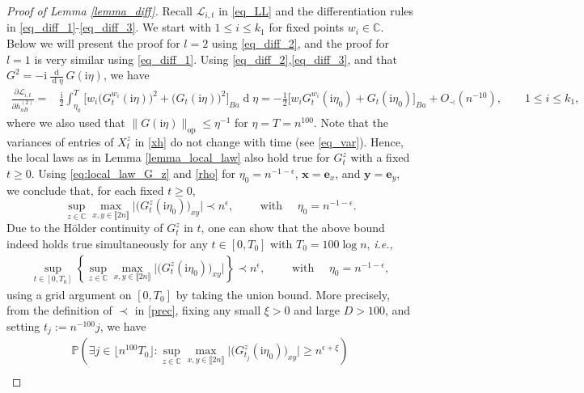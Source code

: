 \documentclass[10pt,reqno]{amsart}
\numberwithin{equation}{section}
\numberwithin{figure}{section}
\theoremstyle{plain}
\newcommand{\C}{{\mathbb{C}}}
\newcommand{\ii}{\mathrm{i}}
\newcommand{\<}{\langle}
\renewcommand{\>}{\rangle}
\renewcommand{\P}{{\mathbb P}}
\newcommand{\dd}{\operatorname{d}\!{}}
\newcommand{\ie}{\emph{i.e., }}
\newcommand{\II}{\mathcal{L}_{i,t}}
\begin{document}
\begin{proof}[Proof of Lemma \ref{lemma_diff}]
	
	Recall $\II$ in \eqref{eq_LL} and the differentiation rules in \eqref{eq_diff_1}-\eqref{eq_diff_3}. We start with $1\leq i\leq k_1$ for fixed points $w_i \in \C$. Below we will present the proof for $l=2$ using \eqref{eq_diff_2}, and the proof for $l=1$ is very similar using \eqref{eq_diff_1}. 
	Using \eqref{eq_diff_2},\eqref{eq_diff_3}, and that $G^2=-\ii \frac{\dd}{\dd \eta} G(\ii \eta)$, we have
	\begin{align}\label{diff_L}
		\frac{\partial \II }{\partial h^{(2)}_{aB}}
		=&\frac{\ii}{2}  \int_{\eta_0}^{T}  \big[ w_i\big(G_t^{w_i}(\ii \eta)\big)^2  +\big(G_t(\ii \eta)\big)^2 \big]_{Ba}  \dd \eta =   -\frac{1}{2}\big[w_i G^{w_i}_t(\ii \eta_0)+G_t(\ii \eta_0)\big]_{Ba} +O_\prec(n^{-10}), \qquad 1\leq i\leq k_1,
	\end{align}
	where we also used that $\|G(\ii \eta)\|_{\mathrm{op}} \leq \eta^{-1}$ for $\eta=T=n^{100}$. Note that the variances of entries of $X^z_t$ in \eqref{xh} do not change with time (see \eqref{eq_var}). Hence, the local laws as in Lemma \ref{lemma_local_law} also hold true for $G^z_t$ with a fixed $t\geq 0$. 
%
%
%
%
%
%
%
%
%
%
%
Using \eqref{eq:local_law_G_z} and \eqref{rho} for $\eta_0=n^{-1-\epsilon}$, $\mathbf{x}=\mathbf{e}_{x}$, and $\mathbf{y}=\mathbf{e}_{y}$, we conclude that, for each fixed $t\geq 0$,
	$$
	\sup_{z\in \C} \max_{x,y \in \llbracket 2n \rrbracket}   \Big|\big( G^{z}_t(\ii \eta_0) \big)_{xy}\Big| \prec n^{\epsilon}, \qquad \mbox{~with~} \quad \eta_0=n^{-1-\epsilon}.
	$$
	Due to the H\"{o}lder continuity of $G^{z}_t$ in $t$, one can show that the above bound indeed holds true simultaneously for any $t\in [0,T_0]$ with $T_0=100\log n$, \ie
	\begin{align}\label{eq_G_bound}
		\sup_{t\in [0,T_0]}  \left\{    \sup_{z\in \C} \max_{x,y \in \llbracket 2n \rrbracket}  \Big|\big( G^{z}_t(\ii \eta_0) \big)_{xy}\Big| \right\} \prec n^{\epsilon}, \qquad \mbox{~with~} \quad \eta_0=n^{-1-\epsilon},
	\end{align}
	using a grid argument on $[0,T_0]$ by taking the union bound.  More precisely, from the definition of $\prec$ in \eqref{prec}, fixing any small $\xi>0$ and large $D>100$, and setting $t_j:=n^{-100}j$, we have 
    \begin{multline}\label{union}
    \P\left( \exists j \in \lfloor n^{100}T_0 \rfloor : \sup_{z\in \C} \max_{x,y \in \llbracket 2n \rrbracket}   \Big|\big( G^{z}_{t_j}(\ii \eta_0) \big)_{xy}\Big| \geq n^{\epsilon+\xi}  \right) \\

\end{multline}
\end{proof}
\end{document}
